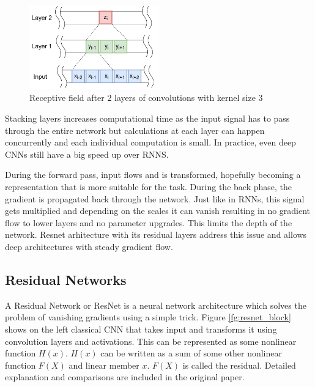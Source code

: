 \documentclass[times, utf8, diplomski, numeric, english]{fer}
\begin{document}
\begin{figure}[!ht]
	\begin{center}
		\includegraphics[width=0.5\textwidth]{./imgs/receptive_field.png}
		\caption{Receptive field after 2 layers of convolutions with kernel size 3}
		\label{fg:receptive field}
	\end{center}
\end{figure}
Stacking layers increases computational time as the input signal has to pass through the entire network but calculations at each layer can happen concurrently and each individual computation is small.
In practice, even deep CNNs still have a big speed up over RNNS.

During the forward pass, input flows and is transformed, hopefully becoming a representation that is more suitable for the task. During the back phase, the gradient is propagated back through the network. Just like in RNNs, this signal gets multiplied and depending on the scales it can vanish resulting in no gradient flow to lower layers and no parameter upgrades. This limits the depth of the network. Resnet arhitecture\cite{resnet} with its residual layers address this issue and allows deep architectures with steady gradient flow.




\subsection{Residual Networks}
A Residual Network or ResNet is a neural network architecture which solves the problem of vanishing gradients using a simple trick.  
Figure \ref{fg:resnet_block}  shows on the left classical CNN that takes input and transforms it using convolution layers and activations.  This can be represented as some nonlinear function $ H(x) $. $ H(x) $ can be written as a sum of some other nonlinear function $F(X)$ and linear member $x$. $F(X) $ is called the residual. Detailed explanation and comparisons are included in the original paper.
\end{document}

